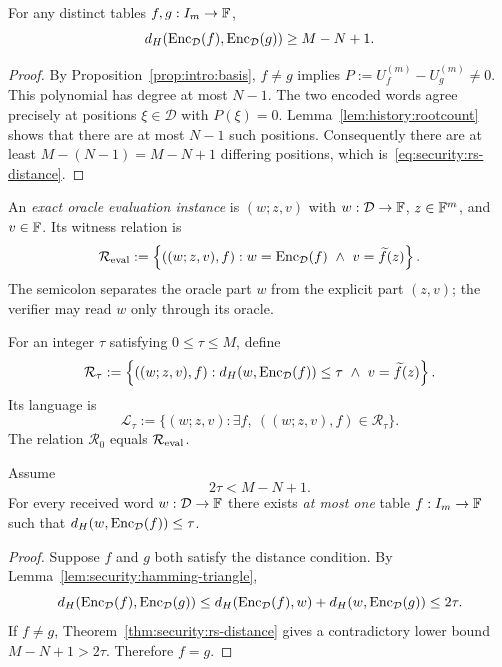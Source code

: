 \begin{theorem}\label{thm:security:rs-distance}
For any distinct tables $f,g:I_m\to\mathbb{F}$,
\begin{equation}\label{eq:security:rs-distance}
 d_H(\operatorname{Enc}_\mathcal D(f),\operatorname{Enc}_\mathcal D(g))\geq M-N+1.
\end{equation}
\end{theorem}
\begin{proof}
By Proposition~\ref{prop:intro:basis}, $f\neq g$ implies
$P:=U_f^{(m)}-U_g^{(m)}\neq0$. This polynomial has degree at most $N-1$. The two encoded words agree precisely at positions $\xi\in\mathcal D$ with $P(\xi)=0$. Lemma~\ref{lem:history:rootcount} shows that there are at most $N-1$ such positions. Consequently there are at least $M-(N-1)=M-N+1$ differing positions, which is~\eqref{eq:security:rs-distance}.
\end{proof}

\begin{definition}\label{def:security:exactrel}
An \emph{exact oracle evaluation instance} is $(w;z,v)$ with
$w:\mathcal D\to\mathbb{F}$, $z\in\mathbb{F}^m$, and $v\in\mathbb{F}$. Its witness relation is
\begin{equation}\label{eq:security:exact-rel}
 \mathcal R_{\rm eval}:=
 \left\{((w;z,v),f):
     w=\operatorname{Enc}_\mathcal D(f)\ \land\ v=\widetilde f(z)\right\}.
\end{equation}
The semicolon separates the oracle part $w$ from the explicit part $(z,v)$; the verifier may read $w$ only through its oracle.
\end{definition}

\begin{definition}\label{def:security:proxrel}
For an integer $\tau$ satisfying $0\leq\tau\leq M$, define
\begin{equation}\label{eq:security:prox-rel}
 \mathcal R_{\tau}:=
 \left\{((w;z,v),f):
       d_H(w,\operatorname{Enc}_\mathcal D(f))\leq\tau\
       \land\ v=\widetilde f(z)\right\}.
\end{equation}
Its language is
\[
 \mathcal L_\tau:=\{(w;z,v):\exists f,\ ((w;z,v),f)\in\mathcal R_\tau\}.
\]
The relation $\mathcal R_0$ equals $\mathcal R_{\rm eval}$.
\end{definition}

\begin{lemma}\label{lem:security:unique-near}
Assume
\[
 2\tau<M-N+1.
\]
For every received word $w:\mathcal D\to\mathbb{F}$ there exists \emph{at most one} table
$f:I_m\to\mathbb{F}$ such that $d_H(w,\operatorname{Enc}_\mathcal D(f))\leq\tau$.
\end{lemma}
\begin{proof}
Suppose $f$ and $g$ both satisfy the distance condition. By Lemma~\ref{lem:security:hamming-triangle},
\[
 d_H(\operatorname{Enc}_\mathcal D(f),\operatorname{Enc}_\mathcal D(g))
 \leq d_H(\operatorname{Enc}_\mathcal D(f),w)+d_H(w,\operatorname{Enc}_\mathcal D(g))
 \leq2\tau.
\]
If $f\neq g$, Theorem~\ref{thm:security:rs-distance} gives a contradictory lower bound $M-N+1>2\tau$. Therefore $f=g$.
\end{proof}

